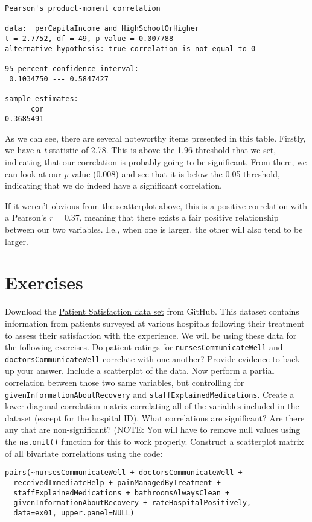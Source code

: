 \begin{framed}
\begin{Verbatim}[samepage=TRUE]
  Pearson's product-moment correlation

data:  perCapitaIncome and HighSchoolOrHigher
t = 2.7752, df = 49, p-value = 0.007788
alternative hypothesis: true correlation is not equal to 0

95 percent confidence interval:
 0.1034750 --- 0.5847427

sample estimates:
      cor 
0.3685491 
\end{Verbatim}
\end{framed}

As we can see, there are several noteworthy items presented in this table. Firstly, we have a \textit{t}-statistic of 2.78. This is above the 1.96 threshold that we set, indicating that our correlation is probably going to be significant. From there, we can look at our \textit{p}-value (0.008) and see that it is below the 0.05 threshold, indicating that we do indeed have a significant correlation.

If it weren't obvious from the scatterplot above, this is a positive correlation with a Pearson's $r=0.37$, meaning that there exists a fair positive relationship between our two variables. I.e., when one is larger, the other will also tend to be larger.

\section{Exercises}

\prob Download the \href{https://raw.githubusercontent.com/faulconbridge/appliedStats/master/LaTeX/part03/data/correlationEx01.csv}{Patient Satisfaction data set} from GitHub. This dataset contains information from patients surveyed at various hospitals following their treatment to assess their satisfaction with the experience. We will be using these data for the following exercises.
\prob Do patient ratings for \verb|nursesCommunicateWell| and \verb|doctorsCommunicateWell| correlate with one another? Provide evidence to back up your answer. Include a scatterplot of the data.
\prob Now perform a partial correlation between those two same variables, but controlling for\\\verb|givenInformationAboutRecovery| and \verb|staffExplainedMedications|.
\prob Create a lower-diagonal correlation matrix correlating all of the variables included in the dataset (except for the hospital ID). What correlations are significant? Are there any that are non-significant? (NOTE: You will have to remove null values using the \verb|na.omit()| function for this to work properly.
\prob Construct a scatterplot matrix of all bivariate correlations using the code:
\begin{framed}
\begin{Verbatim}[samepage=TRUE]
pairs(~nursesCommunicateWell + doctorsCommunicateWell +
  receivedImmediateHelp + painManagedByTreatment +
  staffExplainedMedications + bathroomsAlwaysClean +
  givenInformationAboutRecovery + rateHospitalPositively,
  data=ex01, upper.panel=NULL)
\end{Verbatim}
\end{framed}
  
